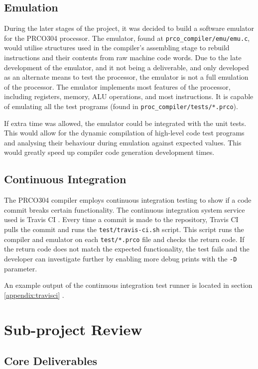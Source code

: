 \documentclass[11pt,a4paper]{report}
\newcommand{\scname}{PRCO304}
\begin{document}
\subsection*{Emulation}
During the later stages of the project, it was decided to build a software emulator for the \scname{} processor. The emulator, found at \verb|prco_compiler/emu/emu.c|, would utilise structures used in the compiler's assembling stage to rebuild instructions and their contents from raw machine code words. Due to the late development of the emulator, and it not being a deliverable, and only developed as an alternate means to test the processor, the emulator is not a full emulation of the processor. The emulator implements most features of the processor, including registers, memory, ALU operations, and most instructions. It is capable of emulating all the test programs (found in \verb|proc_compiler/tests/*.prco|).

If extra time was allowed, the emulator could be integrated with the unit tests. This would allow for the dynamic compilation of high-level code test programs and analysing their behaviour during emulation against expected values. This would greatly speed up compiler code generation development times.

\subsection*{Continuous Integration}
The \scname{} compiler employs continuous integration testing to show if a code commit breaks certain functionality. The continuous integration system service used is Travis CI \citep{travisci}. Every time a commit is made to the repository, Travis CI pulls the commit and runs the \verb|test/travis-ci.sh| script. This script runs the compiler and emulator on each \verb|test/*.prco| file and checks the return code. If the return code does not match the expected functionality, the test fails and the developer can investigate further by enabling more debug prints with the \verb|-D| parameter.

An example output of the continuous integration test runner is located in section \ref{appendix:travisci} {}.

\newpage
\section{Sub-project Review}
\subsection{Core Deliverables}
\end{document}

